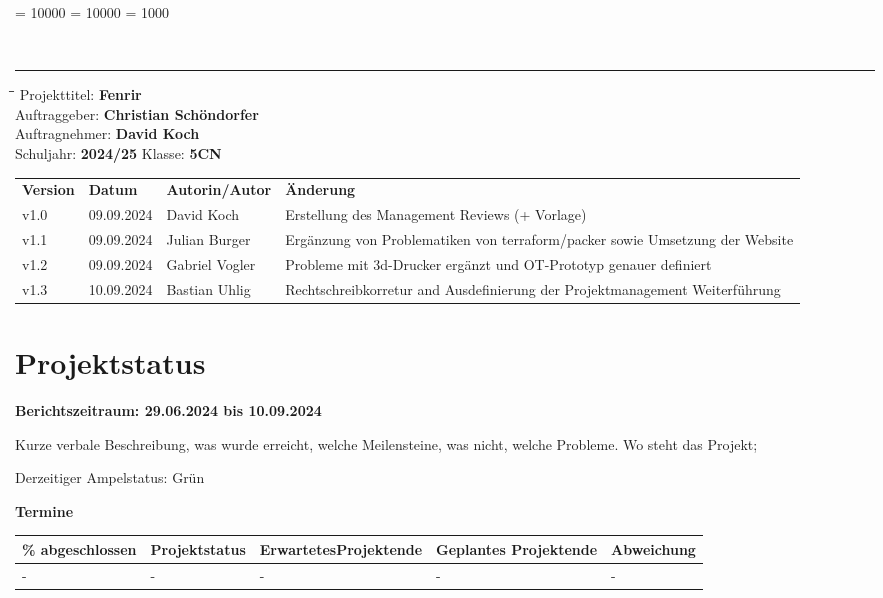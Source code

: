 \documentclass[
	headings=optiontotocandhead,%
	oneside,
	numbers=noenddot,%
	toc=flat, %
	10pt, %
	parskip=full, %
	listof=totoc, %
	listof=flat, %
	numbers=noenddot, %
	bibliography=totoc, %
	a4paper,DIV=14,
]{scrartcl}
\newcommand\Tstrut{\rule{0pt}{3.2ex}}         %
\newcommand\Bstrut{\rule[-1.5ex]{0pt}{0pt}}   %
\newenvironment{nstabbing}
	{\setlength{\topsep}{-\parskip}
		\setlength{\partopsep}{-\parskip}
		\tabbing}
	{\endtabbing}
\begin{document}
\clubpenalty = 10000 %
\widowpenalty = 10000 %
\displaywidowpenalty = 1000

{\sffamily{\textbf{\LARGE{\textcolor{orange}{Management Review}}}}}\\
\noindent\rule{\textwidth}{0.1pt}
\begin{nstabbing}
	\hspace{4cm}\=\hspace{4cm}\=\hspace{4cm}\=\kill
	Projekttitel: \> \textbf{Fenrir}\\
	Auftraggeber: \> \textbf{Christian Schöndorfer}\\
	Auftragnehmer: \> \textbf{David Koch}\\
	Schuljahr: \> \textbf{2024/25}
	\> Klasse: \> \textbf{5CN}\\
\end{nstabbing}
{\smaller
	\begin{tabularx}{\textwidth}{l l l l}
	\hline
	\textbf{Version} & \textbf{Datum} & \textbf{Autorin/Autor} & \textbf{Änderung}\Tstrut  \\
	v1.0 & 09.09.2024 & David Koch & Erstellung des Management Reviews (+ Vorlage)\Bstrut  \\
	v1.1 & 09.09.2024 & Julian Burger & Ergänzung von Problematiken von terraform/packer sowie Umsetzung der Website\Bstrut  \\
	v1.2 & 09.09.2024 & Gabriel Vogler & Probleme mit 3d-Drucker ergänzt und OT-Prototyp genauer definiert\Bstrut  \\
	v1.3 & 10.09.2024 & Bastian Uhlig & Rechtschreibkorretur and Ausdefinierung der Projektmanagement Weiterführung \Bstrut \\
	\hline
	\end{tabularx}
}

\section{Projektstatus}
\textbf{Berichtszeitraum: 29.06.2024 bis 10.09.2024}

Kurze verbale Beschreibung, was wurde erreicht, welche Meilensteine, was nicht, welche Probleme. Wo steht das Projekt; 

Derzeitiger Ampelstatus: Grün

\textbf{Termine}

{\smaller
	\begin{tabularx}{\textwidth}{|X|X|X|X|X|}
		\hline
		\textbf{\% abgeschlossen} & \textbf{Projektstatus} & \textbf{Erwartetes\newline Projektende} & \textbf{Geplantes Projektende} & \textbf{Abweichung} \\
		\hline
		- & - & - & - & - \\
		\hline
	\end{tabularx}
}
\end{document}
